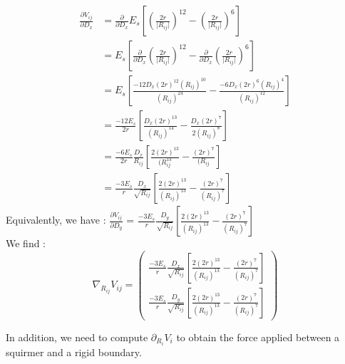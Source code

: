 \documentclass{article}
\begin{document}
\begin{align*}
\frac{\partial V_{ij}}{\partial D_x} &= \frac{\partial}{\partial D_x}E_s\left[\left(\frac{2r}{\lvert R_{ij}\rvert}\right)^{12} - \left(\frac{2r}{\lvert R_{ij}\rvert}\right)^6\right] \\
&= E_s \left[\frac{\partial}{\partial D_x}\left(\frac{2r}{\lvert R_{ij}\rvert}\right)^{12} - \frac{\partial}{\partial D_x} \left(\frac{2r}{\lvert R_{ij}\rvert}\right)^6\right] \\
&= E_s \left[ \frac{-12 D_x (2r)^{12}(R_{ij})^{10}}{(R_{ij})^{24}} - \frac{-6D_x(2r)^6(R_{ij})^4}{(R_{ij})^12}  \right] \\
&= \frac{-12 E_s}{2r} \left[ \frac{D_x (2r)^{13}}{(R_{ij})^{14}} - \frac{D_x (2r)^{7}}{2(R_{ij})^8}\right] \\
&= \frac{-6 E_s}{2r} \frac{D_x}{R_{ij}} \left[ \frac{2(2r)^{13}}{(R_{ij}^13} - \frac{(2r)^7}{(R_{ij}}\right] \\
&= \frac{-3 E_s}{r} \frac{D_x}{\sqrt{R_{ij}}}\left[ \frac{2(2r)^{13}}{(R_{ij})^13} - \frac{(2r)^7}{(R_{ij})^7} \right]
\end{align*}
Equivalently, we have : 
$\frac{\partial V_{ij}}{\partial D_y}$ = $\frac{-3 E_s}{r} \frac{D_y}{\sqrt{R_{ij}}}\left[ \frac{2(2r)^{13}}{(R_{ij})^13} - \frac{(2r)^7}{(R_{ij})^7} \right]$
\\ We find : 
\begin{equation*}
    \boxed{\nabla_{R_{ij}} V_{ij} = 
    \begin{pmatrix}
        \frac{-3 E_s}{r} \frac{D_x}{\sqrt{R_{ij}}}\left[ \frac{2(2r)^{13}}{(R_{ij})^{13}} - \frac{(2r)^7}{(R_{ij})^7} \right] \\
        \frac{-3 E_s}{r} \frac{D_y}{\sqrt{R_{ij}}}\left[ \frac{2(2r)^{13}}{(R_{ij})^{13}} - \frac{(2r)^7}{(R_{ij})^7} \right]
    \end{pmatrix}}
\end{equation*}

\vspace{0,5cm}

In addition, we need to compute $\partial_{R_i} V_i$ to obtain the force applied between a squirmer and a rigid boundary.
\end{document}
